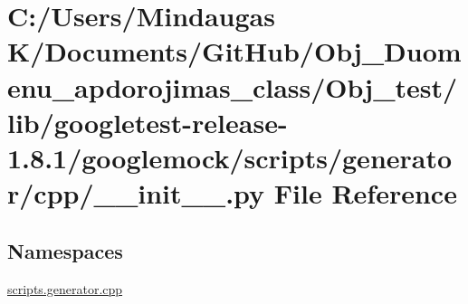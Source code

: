 \hypertarget{_obj__test_2lib_2googletest-release-1_88_81_2googlemock_2scripts_2generator_2cpp_2____init_____8py}{}\section{C\+:/\+Users/\+Mindaugas K/\+Documents/\+Git\+Hub/\+Obj\+\_\+\+Duomenu\+\_\+apdorojimas\+\_\+class/\+Obj\+\_\+test/lib/googletest-\/release-\/1.8.1/googlemock/scripts/generator/cpp/\+\_\+\+\_\+init\+\_\+\+\_\+.py File Reference}
\label{_obj__test_2lib_2googletest-release-1_88_81_2googlemock_2scripts_2generator_2cpp_2____init_____8py}
\subsection*{Namespaces}
\begin{DoxyCompactItemize}
\item 
 \mbox{\hyperlink{namespacescripts_1_1generator_1_1cpp}{scripts.\+generator.\+cpp}}
\end{DoxyCompactItemize}
